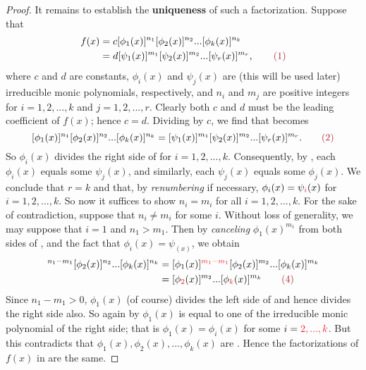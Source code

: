 \begin{proof}
It remains to establish the \textbf{uniqueness} of such a factorization.
Suppose that
\begin{align*}
    f(x) & = c[\phi_1(x)]^{n_1}[\phi_2(x)]^{n_2}...[\phi_k(x)]^{n_k} \\
         & = d[\psi_1(x)]^{m_1}[\psi_2(x)]^{m_2}...[\psi_r(x)]^{m_r}, \quad \quad \MAROON{(1)}
\end{align*}
where \(c\) and \(d\) are constants,
\(\phi_i(x)\) and \(\psi_j(x)\) are  (this will be used later) irreducible monic polynomials, respectively,
and \(n_i\) and \(m_j\) are positive integers for \(i = 1, 2, ..., k\) and \(j = 1, 2, ..., r\).
Clearly both \(c\) and \(d\) must be the leading coefficient of \(f(x)\); hence \(c = d\).
Dividing by \(c\), we find that  becomes
\[
    [\phi_1(x)]^{n_1}[\phi_2(x)]^{n_2}...[\phi_k(x)]^{n_k} = [\psi_1(x)]^{m_1}[\psi_2(x)]^{m_2}...[\psi_r(x)]^{m_r}. \quad \quad \MAROON{(2)}
\]
So \(\phi_i(x)\) divides the right side of  for \(i = 1, 2, ..., k\).
Consequently, by , each \(\phi_i(x)\) equals some \(\psi_j(x)\), and similarly,
each \(\psi_j(x)\) equals some \(\phi_j(x)\).
We conclude that \(r = k\) and that, by \emph{renumbering} if necessary,
\(\phi_i(x) = \psi_{\RED{i}}(x)\) for \(i = 1, 2, ..., k\). 
So now it suffices to show \(n_i = m_i\) for all \(i = 1, 2, ..., k\).
For the sake of contradiction, suppose that \(n_i \ne m_i\) for some \(i\).
Without loss of generality, we may suppose that \(i = 1\) and \(n_1 > m_1\).
Then by \emph{canceling} \(\phi_1(x)^{m_1}\) from both sides of , and the fact  that \(\phi_i(x) = \psi_(x)\), we obtain
\begin{align*}
    [\phi_1(x)]^{n_1 - m_1}[\phi_2(x)]^{n_2}...[\phi_k(x)]^{n_k} & = [\phi_1(x)]^{\RED{m_1 - m_1}}[\phi_2(x)]^{m_2}...[\phi_k(x)]^{m_k} \\
    & = [\phi_{\RED{2}}(x)]^{m_2}...[\phi_{\RED{k}}(x)]^{m_k} \quad \quad \MAROON{(4)}
\end{align*}
Since \(n_1 - m_1 > 0\), \(\phi_1(x)\) (of course) divides the left side of  and hence divides the right side also.
So again by  \(\phi_1(x)\) is equal to one of the irreducible monic polynomial of the right side;
that is \(\phi_1(x) = \phi_i(x)\) for some \(i = \RED{2, ... , k}\).
But this contradicts that \(\phi_1(x), \phi_2(x), ..., \phi_k(x)\) are .
Hence the factorizations of \(f(x)\) in  are the same.
\end{proof}

